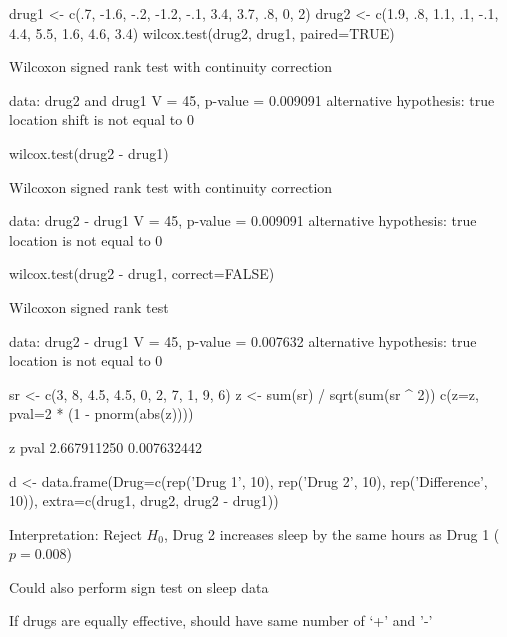 \begin{Schunk}
\begin{Sinput}
drug1 <- c(.7, -1.6, -.2, -1.2, -.1, 3.4, 3.7, .8, 0, 2)
drug2 <- c(1.9, .8, 1.1, .1, -.1, 4.4, 5.5, 1.6, 4.6, 3.4)
wilcox.test(drug2, drug1, paired=TRUE)
\end{Sinput}
\begin{Soutput}

	Wilcoxon signed rank test with continuity correction

data:  drug2 and drug1
V = 45, p-value = 0.009091
alternative hypothesis: true location shift is not equal to 0
\end{Soutput}
\begin{Sinput}
wilcox.test(drug2 - drug1)
\end{Sinput}
\begin{Soutput}

	Wilcoxon signed rank test with continuity correction

data:  drug2 - drug1
V = 45, p-value = 0.009091
alternative hypothesis: true location is not equal to 0
\end{Soutput}
\begin{Sinput}
wilcox.test(drug2 - drug1, correct=FALSE)
\end{Sinput}
\begin{Soutput}

	Wilcoxon signed rank test

data:  drug2 - drug1
V = 45, p-value = 0.007632
alternative hypothesis: true location is not equal to 0
\end{Soutput}
\begin{Sinput}
sr <- c(3, 8, 4.5, 4.5, 0, 2, 7, 1, 9, 6)
z <- sum(sr) / sqrt(sum(sr ^ 2))
c(z=z, pval=2 * (1 - pnorm(abs(z))))
\end{Sinput}
\begin{Soutput}
          z        pval 
2.667911250 0.007632442 
\end{Soutput}
\begin{Sinput}
d <- data.frame(Drug=c(rep('Drug 1', 10), rep('Drug 2', 10),
                  rep('Difference', 10)),
                extra=c(drug1, drug2, drug2 - drug1))
\end{Sinput}
\end{Schunk}
\bi 
\item Interpretation: Reject $H_0$, Drug 2 increases sleep by the same hours as Drug 1 ($p = 0.008$)
\item Could also perform sign test on sleep data
 \bi
 \item If drugs are equally effective, should have same number of `+' and '-'

